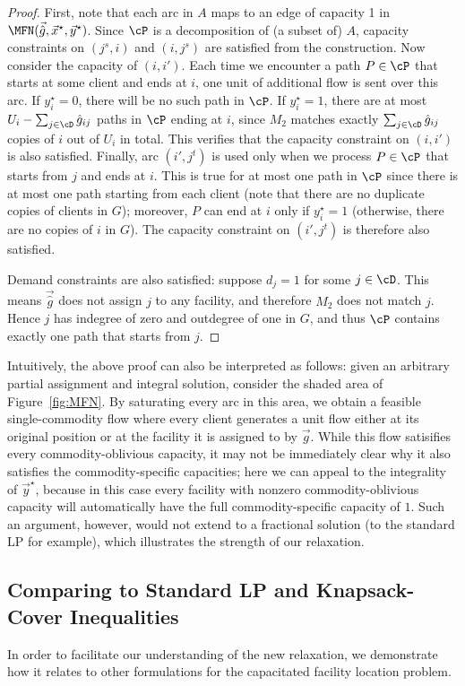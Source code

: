 \begin{proof}
First, note that each arc in $A$ maps to an edge of capacity 1 in $\MFN(\vec{\hat g},\vec
x^{\star},\vec y^{\star})$.
Since $\cP$ is a decomposition of
(a subset of) $A$, capacity constraints on $( j^s,i)$ and $( i,j^s)$ are
satisfied from the construction. Now consider the capacity of $( i,i')$. Each time we
encounter a path $P\in\cP$ that starts at some client and ends at $i$, one unit of additional flow
is sent over this arc. If $y^{\star}_i=0$, there will be no such path in $\cP$. If $y^{\star}_i=1$,
there are at most $U_i-\sum_{j\in\cD}\hat g_{ij}$ paths in $\cP$ ending at $i$, since $M_2$ matches
exactly $\sum_{j\in\cD}\hat g_{ij}$ copies of $i$ out of $U_i$ in total. This verifies that the
capacity constraint on $( i,i')$ is also satisfied. Finally, arc $( i',j^t)$
is used only when we process $P\in\cP$ that starts from $j$ and ends at $i$. This is true for at
most one path in $\cP$ since there is at most one path starting from each client (note that there
are no duplicate copies of clients in $G$); moreover, $P$ can end at $i$ only if $y^{\star}_i=1$
(otherwise, there are no copies of $i$ in $G$). The capacity constraint on $( i',j^t)$
is therefore also satisfied.

Demand constraints are also satisfied: suppose $d_j=1$ for some $j\in\cD$. This means $\vec{\hat g}$ does not assign $j$ to any facility, and therefore $M_2$ does not match $j$. Hence $j$ has indegree of zero and outdegree of one in $G$, and thus $\cP$ contains exactly one path that starts from $j$.
\end{proof}

Intuitively, the above proof can also be interpreted as follows: given an arbitrary partial assignment and integral solution, consider the shaded area of Figure~\ref{fig:MFN}. By saturating every arc in this area, we obtain a feasible single-commodity flow where every client generates a unit flow either at its original position or at the facility it is assigned to by $\vec g$. While this flow satisifies every commodity-oblivious capacity, it may not be immediately clear why it also satisfies the commodity-specific capacities; here we can appeal to the integrality of $\vec y^\star$, because in this case every facility with nonzero commodity-oblivious capacity will automatically have the full commodity-specific capacity of $1$. Such an argument, however, would not extend to a fractional solution (to the standard LP for example), which illustrates the strength of our relaxation.

\subsection{Comparing \MFNLP to Standard LP and  Knapsack-Cover Inequalities}\label{sec:knapsack}
In order to facilitate our understanding of the new relaxation, we demonstrate how it relates to
other formulations for the capacitated facility location problem.

